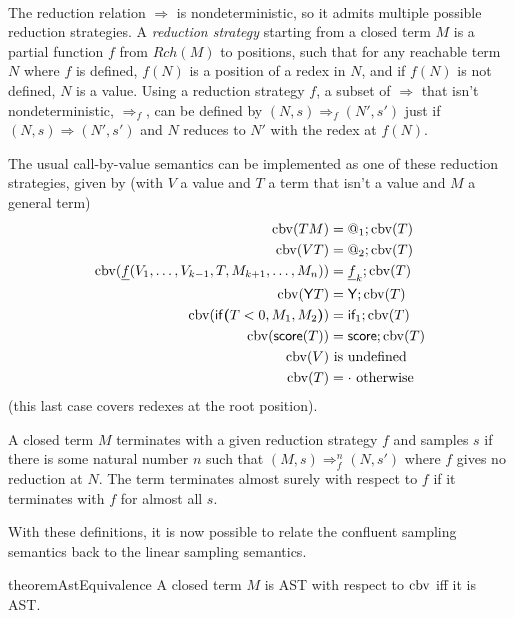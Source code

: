 \paragraph{}
The reduction relation $\Rightarrow$ is nondeterministic, so it admits multiple possible reduction strategies. 
A \emph{reduction strategy} starting from a closed term $M$ is a partial function $f$ from $Rch(M)$ to positions, such that for any reachable term $N$ where $f$ is defined, $f(N)$ is a position of a redex in $N$, and if $f(N)$ is not defined, $N$ is a value.
Using a reduction strategy $f$, a subset of $\Rightarrow$ that isn't nondeterministic, $\Rightarrow_f$, can be defined by $(N,s) \Rightarrow_f (N',s')$ just if $(N,s) \Rightarrow (N',s')$ and $N$ reduces to $N'$ with the redex at $f(N)$.

The usual call-by-value semantics can be implemented as one of these reduction strategies, given by (with $V$ a value and $T$ a term that isn't a value and $M$ a general term)
\begin{align*}
\operatorname{cbv}(T M) & = @_1 ; \operatorname{cbv}(T) \\
\operatorname{cbv}(V T) & = @_2 ; \operatorname{cbv}(T) \\
\operatorname{cbv}(\underline f(V_1, \dots, V_{k-1}, T, M_{k+1}, \dots, M_n)) & = \underline f_k ; \operatorname{cbv}(T) \\
\operatorname{cbv}(\mathsf{Y} T) & = \mathsf{Y} ; \operatorname{cbv}(T) \\
\operatorname{cbv}(\mathsf{if}\boldsymbol{(}T < 0, M_1, M_2\boldsymbol{)}) & = \textsf{if}_1 ; \operatorname{cbv}(T) \\
\operatorname{cbv}(\mathsf{score}(T)) & = \mathsf{score} ; \operatorname{cbv}(T) \\
\operatorname{cbv}(V) & \text{ is undefined} \\
\operatorname{cbv}(T) & = \cdot \text{ otherwise}
\end{align*}
(this last case covers redexes at the root position).

A closed term $M$ terminates with a given reduction strategy $f$ and samples $s$ if there is some natural number $n$ such that $(M,s) \Rightarrow_f^n (N,s')$ where $f$ gives no reduction at $N$. The term terminates almost surely with respect to $f$ if it terminates with $f$ for almost all $s$.

With these definitions, it is now possible to relate the confluent sampling semantics back to the linear sampling semantics.

\begin{restatable}{theorem}{AstEquivalence} \label{thm:AstEquivalence}
A closed term $M$ is AST with respect to $\operatorname{cbv}$ iff it is AST.
\end{restatable}

